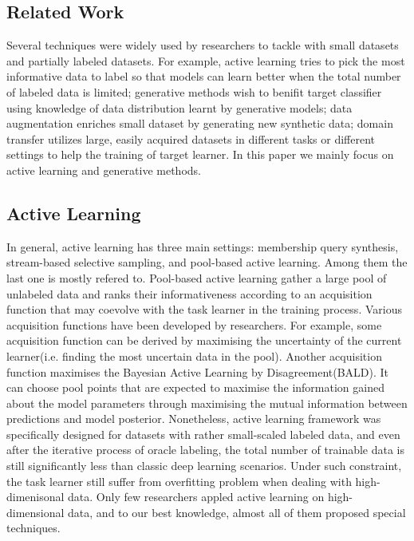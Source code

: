 \documentclass[10pt,twocolumn,letterpaper]{article}
\begin{document}
\subsection{Related Work}
Several techniques were widely used by researchers to tackle with small datasets and partially labeled datasets. For example, active learning\cite{settles2009active} tries to pick the most informative data to label so that models can learn better when the total number of labeled data is limited; generative methods\cite{kingma2014semi}\cite{springenberg2015unsupervised} wish to benifit target classifier using knowledge of data distribution learnt by generative models; data augmentation\cite{tanner1987calculation} enriches small dataset by generating new synthetic data; domain transfer\cite{pan2009survey} utilizes large, easily acquired datasets in different tasks or different settings to help the training of target learner. In this paper we mainly focus on active learning and generative methods.
\subsection{Active Learning}
In general, active learning has three main settings: membership query synthesis, stream-based selective sampling, and
pool-based active learning\cite{pan2009survey}. Among them the last one is mostly refered to. Pool-based active learning gather a large pool of unlabeled data and ranks their informativeness according to an acquisition function that may coevolve with the task learner in the training process. Various acquisition functions have been developed by researchers. For example, some acquisition function can be derived by maximising the uncertainty of the current learner(i.e. finding the most uncertain data in the pool). Another acquisition function maximises the Bayesian Active Learning by Disagreement(BALD)\cite{houlsby2011bayesian}. It can choose pool points that are expected to maximise the information gained about the model parameters through maximising the mutual information between predictions and model posterior. Nonetheless, active learning framework was specifically designed for datasets with rather small-scaled labeled data, and even after the iterative process of oracle labeling, the total number of trainable data is still significantly less than classic deep learning scenarios. Under such constraint, the task learner still suffer from overfitting problem when dealing with high-dimenisonal data. Only few researchers appled active learning on high-dimensional data, and to our best knowledge, almost all of them proposed special techniques\cite{Gal:2017:DBA:3305381.3305504}.
\end{document}
